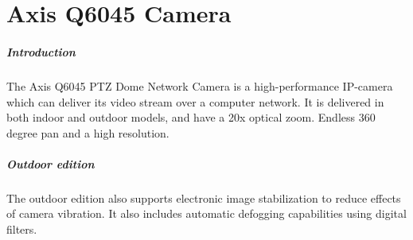 \chapter{Axis Q6045 Camera}
\paragraph{Introduction}
The Axis Q6045 PTZ Dome Network Camera is a high-performance IP-camera which can deliver its video stream over a computer network. It is delivered in both indoor and outdoor models, and have a 20x optical zoom. Endless 360 degree pan and a high resolution.

\paragraph{Outdoor edition}
The outdoor edition also supports electronic image stabilization to reduce effects of camera vibration. It also includes automatic defogging capabilities using digital filters.

